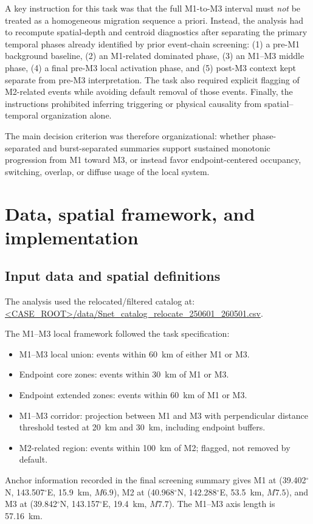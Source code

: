 \documentclass[11pt]{article}
\begin{document}
A key instruction for this task was that the full M1-to-M3 interval must \emph{not} be treated as a homogeneous migration sequence a priori. Instead, the analysis had to recompute spatial-depth and centroid diagnostics after separating the primary temporal phases already identified by prior event-chain screening: (1) a pre-M1 background baseline, (2) an M1-related dominated phase, (3) an M1--M3 middle phase, (4) a final pre-M3 local activation phase, and (5) post-M3 context kept separate from pre-M3 interpretation. The task also required explicit flagging of M2-related events while avoiding default removal of those events. Finally, the instructions prohibited inferring triggering or physical causality from spatial--temporal organization alone.

The main decision criterion was therefore organizational: whether phase-separated and burst-separated summaries support sustained monotonic progression from M1 toward M3, or instead favor endpoint-centered occupancy, switching, overlap, or diffuse usage of the local system.

\section{Data, spatial framework, and implementation}
\subsection{Input data and spatial definitions}
The analysis used the relocated/filtered catalog at:
\url{<CASE_ROOT>/data/Snet_catalog_relocate_250601_260501.csv}.

The M1--M3 local framework followed the task specification:
\begin{itemize}[leftmargin=1.5em]
    \item M1--M3 local union: events within \SI{60}{km} of either M1 or M3.
    \item Endpoint core zones: events within \SI{30}{km} of M1 or M3.
    \item Endpoint extended zones: events within \SI{60}{km} of M1 or M3.
    \item M1--M3 corridor: projection between M1 and M3 with perpendicular distance threshold tested at \SI{20}{km} and \SI{30}{km}, including endpoint buffers.
    \item M2-related region: events within \SI{100}{km} of M2; flagged, not removed by default.
\end{itemize}

Anchor information recorded in the final screening summary gives M1 at (39.402$^{\circ}$N, 143.507$^{\circ}$E, \SI{15.9}{km}, $M6.9$), M2 at (40.968$^{\circ}$N, 142.288$^{\circ}$E, \SI{53.5}{km}, $M7.5$), and M3 at (39.842$^{\circ}$N, 143.157$^{\circ}$E, \SI{19.4}{km}, $M7.7$). The M1--M3 axis length is \SI{57.16}{km}.
\end{document}
